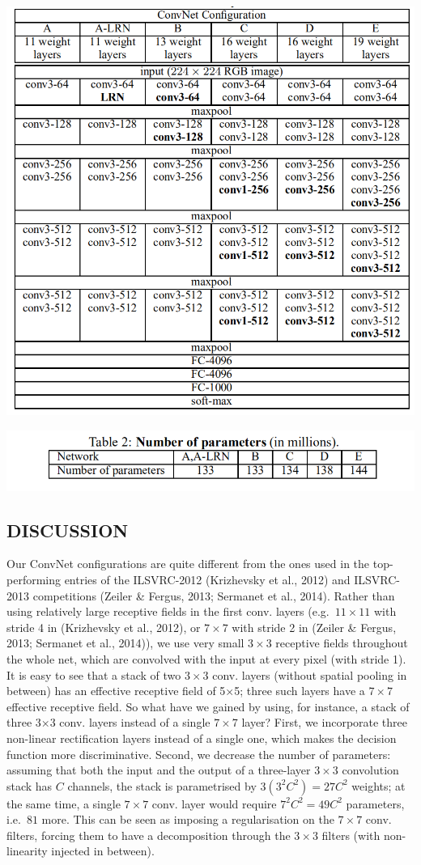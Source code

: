 \documentclass[12pt,a4paper,UTF8,twoside]{book}
\begin{document}
\begin{center}\includegraphics[width=0.7\linewidth]{img/03-01} \end{center}

\begin{center}\includegraphics[width=0.7\linewidth]{img/03-02} \end{center}

\hypertarget{discussion}{%
\subsection{DISCUSSION}\label{discussion}}

Our ConvNet configurations are quite different from the ones used in the top-performing entries of the ILSVRC-2012 (Krizhevsky et al., 2012) and ILSVRC-2013 competitions (Zeiler \& Fergus, 2013; Sermanet et al., 2014). Rather than using relatively large receptive fields in the first conv. layers (e.g.~\(11×11\) with stride 4 in (Krizhevsky et al., 2012), or \(7×7\) with stride 2 in (Zeiler \& Fergus, 2013; Sermanet et al., 2014)), we use very small \(3 × 3\) receptive fields throughout the whole net, which are convolved with the input at every pixel (with stride 1). It is easy to see that a stack of two \(3×3\) conv. layers (without spatial pooling in between) has an effective receptive field of 5×5; three such layers have a \(7 × 7\) effective receptive field. So what have we gained by using, for instance, a stack of three 3×3 conv. layers instead of a single \(7×7\) layer? First, we incorporate three non-linear rectification layers instead of a single one, which makes the decision function more discriminative. Second, we decrease the number of parameters: assuming that both the input and the output of a three-layer \(3 × 3\) convolution stack has \(C\) channels, the stack is parametrised by \(3(3^2C^2) = 27C^2\) weights; at the same time, a single \(7 × 7\) conv. layer would require \(7^2C^2 = 49C^2\) parameters, i.e.~\(81%
\) more. This can be seen as imposing a regularisation on the \(7 × 7\) conv. filters, forcing them to have a decomposition through the \(3 × 3\) filters (with non-linearity injected in between).
\end{document}
